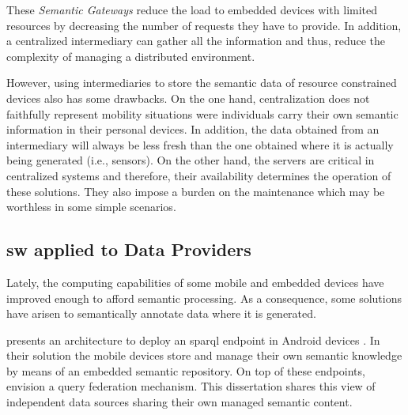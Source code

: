 These \emph{Semantic Gateways} reduce the load to embedded devices with limited resources by decreasing the number of requests they have to provide.
In addition, a centralized intermediary can gather all the information and thus, reduce the complexity of managing a distributed environment.

However, using intermediaries to store the semantic data of resource constrained devices also has some drawbacks.
On the one hand, centralization does not faithfully represent mobility situations were individuals carry their own semantic information in their personal devices.
In addition, the data obtained from an intermediary will always be less fresh than the one obtained where it is actually being generated (i.e., sensors).
On the other hand, the servers are critical in centralized systems and therefore, their availability determines the operation of these solutions.
They also impose a burden on the maintenance which may be worthless in some simple scenarios.



\subsection{\acl{sw} applied to Data Providers}
\label{sec:sw_providers}

Lately, the computing capabilities of some mobile and embedded devices have improved enough to afford semantic processing. %
As a consequence, some solutions have arisen to semantically annotate data where it is generated. %


\citet{daquin_enabling_2011} presents an architecture to deploy an \acs{sparql}  endpoint in Android devices .
In their solution the mobile devices store and manage their own semantic knowledge by means of an embedded semantic repository.
On top of these endpoints, \citeauthor{daquin_enabling_2011} envision a query federation mechanism.
This dissertation shares this view of independent data sources sharing their own managed semantic content. %


